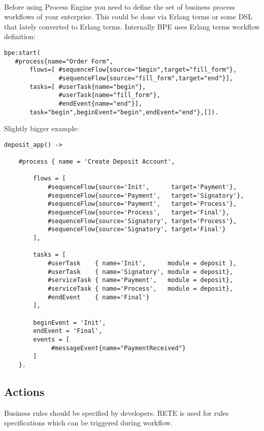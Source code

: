 \paragraph{}
Before using Process Engine you need to define the set of business process
workflows of your enterprise. This could be done via Erlang terms or some DSL
that lately converted to Erlang terms. Internally BPE uses Erlang terms
workflow definition:

\vspace{1\baselineskip}
\begin{lstlisting}
bpe:start(
   #process{name="Order Form",
       flows=[ #sequenceFlow{source="begin",target="fill_form"},
               #sequenceFlow{source="fill_form",target="end"}],
       tasks=[ #userTask{name="begin"},
               #userTask{name="fill_form"},
               #endEvent{name="end"}],
       task="begin",beginEvent="begin",endEvent="end"},[]).
\end{lstlisting}


\newpage
Slightly bigger example:

\vspace{1\baselineskip}
\begin{lstlisting}
deposit_app() ->

    #process { name = 'Create Deposit Account',

        flows = [
            #sequenceFlow{source='Init',      target='Payment'},
            #sequenceFlow{source='Payment',   target='Signatory'},
            #sequenceFlow{source='Payment',   target='Process'},
            #sequenceFlow{source='Process',   target='Final'},
            #sequenceFlow{source='Signatory', target='Process'},
            #sequenceFlow{source='Signatory', target='Final'}
        ],

        tasks = [
            #userTask    { name='Init',      module = deposit },
            #userTask    { name='Signatory', module = deposit},
            #serviceTask { name='Payment',   module = deposit},
            #serviceTask { name='Process',   module = deposit},
            #endEvent    { name='Final'}
        ],

        beginEvent = 'Init',
        endEvent = 'Final',
        events = [
             #messageEvent{name="PaymentReceived"}
        ]
    }.
\end{lstlisting}

\subsection{Actions}
Business rules should be specified by developers.
RETE is used for rules specifications which can be triggered during workflow.

